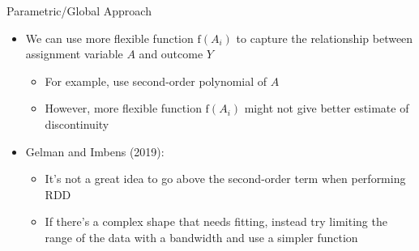 \documentclass[hyperref={pdfpagelabels=false}]{beamer}
\begin{document}
\begin{frame}{Parametric/Global Approach}
	\begin{itemize}
		
		
		
		\item We can use more flexible function $\mathrm{f}(A_i)$ to capture the relationship between assignment variable $A$ and outcome $Y$
									\vspace{0.2cm}
			\begin{itemize}
			\item For example, use second-order polynomial of $A$
							\vspace{0.2cm}
		\item However, more flexible function $\mathrm{f}(A_i)$ might not give better estimate of discontinuity  
					\vspace{0.2cm}
				\end{itemize}		
		\item Gelman and Imbens (2019): 
							\vspace{0.2cm}
			\begin{itemize}
		\item It's not a great idea to go above the second-order term when performing RDD
						\vspace{0.2cm}
	
	\item If there's a complex shape that needs fitting, instead try limiting the range of the data with a bandwidth and use a simpler function
		\end{itemize}
	\end{itemize}
\end{frame}
\end{document}
